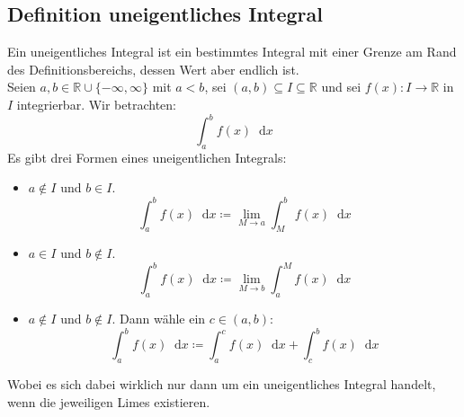 \documentclass[halfparscip]{scrartcl}
\newcommand*\dif{\mathop{}\!\mathrm{d}}
\newcounter{subsection2}
\begin{document}
\subsection*{Definition uneigentliches Integral}
Ein uneigentliches Integral ist ein bestimmtes Integral mit einer Grenze am Rand des Definitionsbereichs, dessen Wert aber endlich ist.\\
Seien $a, b \in \mathbb{R} \cup \{-\infty, \infty\}$ mit $a < b$, sei $(a, b) \subseteq I \subseteq \mathbb{R}$ und 
sei $f(x) : I \rightarrow \mathbb{R}$ in $I$ integrierbar. Wir betrachten:
\begin{equation*}
	\int_a^b f(x) \dif x
\end{equation*}
Es gibt drei Formen eines uneigentlichen Integrals:
\begin{itemize}
	\item $a \notin I$ und $b \in I$.
	\begin{equation*}
		\int_{a}^{b} f(x) \dif x \coloneqq \lim_{M \rightarrow a} \int_{M}^{b} f(x) \dif x
	\end{equation*}
	\item $a \in I$ und $b \notin I$.
	\begin{equation*}
		\int_{a}^{b} f(x) \dif x \coloneqq \lim_{M \rightarrow b} \int_{a}^{M} f(x) \dif x
	\end{equation*}
	\item $a \notin I$ und $b \notin I$. Dann wähle ein $c \in (a, b)$:
	\begin{equation*}
		\int_{a}^{b} f(x) \dif x \coloneqq \int_{a}^{c} f(x) \dif x + \int_c^b f(x) \dif x
	\end{equation*}
\end{itemize}
Wobei es sich dabei wirklich nur dann um ein uneigentliches Integral handelt, wenn die jeweiligen Limes existieren.
\end{document}
